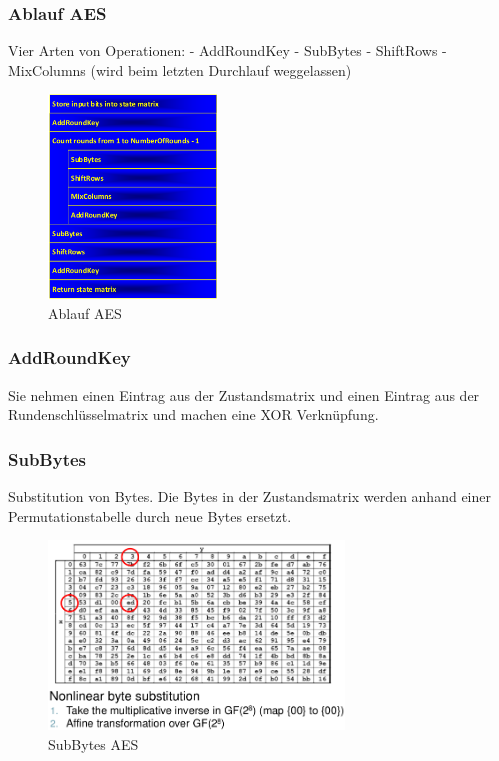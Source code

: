 \hypertarget{ablauf-aes}{%
\subsubsection{Ablauf AES}\label{ablauf-aes}}

Vier Arten von Operationen: - AddRoundKey - SubBytes - ShiftRows -
MixColumns (wird beim letzten Durchlauf weggelassen)

\begin{figure}[H]
\centering
\includegraphics[width=0.4\textwidth]{figures/ablaufAES.png}
\caption{Ablauf AES}
\end{figure}

\hypertarget{addroundkey}{%
\subsubsection{AddRoundKey}\label{addroundkey}}

Sie nehmen einen Eintrag aus der Zustandsmatrix und einen Eintrag aus
der Rundenschlüsselmatrix und machen eine XOR Verknüpfung.

\hypertarget{subbytes}{%
\subsubsection{SubBytes}\label{subbytes}}

Substitution von Bytes. Die Bytes in der Zustandsmatrix werden anhand
einer Permutationstabelle durch neue Bytes ersetzt.

\begin{figure}[H]
\centering
\includegraphics[width=0.7\textwidth]{figures/subBytesAES.png}
\caption{SubBytes AES}
\end{figure}

